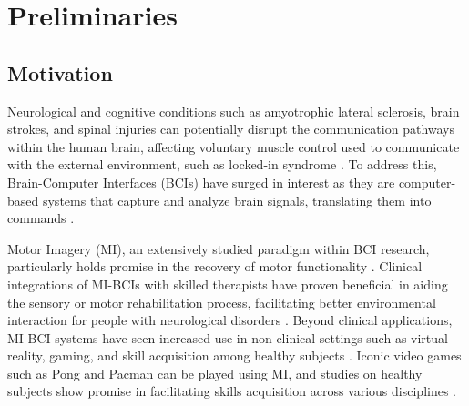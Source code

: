 \chapter{Preliminaries}

\section{Motivation}

Neurological and cognitive conditions such as amyotrophic lateral sclerosis, brain strokes, and spinal injuries can potentially disrupt the communication pathways within the human brain, affecting voluntary muscle control used to communicate with the external environment, such as locked-in syndrome \cite{sisti2022brief, mcfarland2011brain}. To address this, Brain-Computer Interfaces (BCIs) have surged in interest as they are computer-based systems that capture and analyze brain signals, translating them into commands \cite{khan2020review, ramadan2015basics}. 

Motor Imagery (MI), an extensively studied paradigm within BCI research, particularly holds promise in the recovery of motor functionality \cite{bonci2021introductory}. Clinical integrations of MI-BCIs with skilled therapists have proven beneficial in aiding the sensory or motor rehabilitation process, facilitating better environmental interaction for people with neurological disorders \cite{sitaram2017closed, hochberg2012reach,lebedev2006brain}. Beyond clinical applications, MI-BCI systems have seen increased use in non-clinical settings such as virtual reality, gaming, and skill acquisition among healthy subjects \cite{cattan2018recommendations}. Iconic video games such as Pong and Pacman can be played using MI, and studies on healthy subjects show promise in facilitating skills acquisition across various disciplines \cite{ahn2014review, ganin2013p300, johnson2018combined, perdikis2018cybathlon}. 

